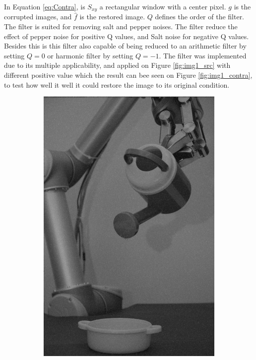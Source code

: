 In Equation \ref{eq:Contra}, is $S_{xy}$ a rectangular  window with a center pixel. $g$ is the corrupted images, and $\hat{f}$ is the restored image. $Q$ defines the order of the filter.  \\
The filter is suited for removing salt and pepper noises. The filter reduce the effect of pepper noise for positive Q values, and Salt noise for negative Q values.  Besides this is this filter also capable of being reduced to an arithmetic filter by setting $Q = 0$ or harmonic filter by setting $Q = -1$. The filter was implemented due to its multiple applicability, and applied on Figure \ref{fig:img1_src} with different positive value which the result can bee seen on Figure \ref{fig:img1_contra}, to test how well it well it could restore the image to its original condition.  

\begin{figure}[H]
    \centering
    \begin{subfigure}[b]{0.3\textwidth}
        \includegraphics[width=\textwidth]{img1/img_1_gaus_5_1.png}

\end{subfigure}
\end{figure}
